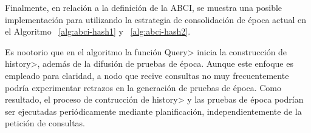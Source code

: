 
Finalmente, en relación a la definición de la ABCI, se muestra una posible implementación para
\hashchain utilizando la estrategia de consolidación de época actual en el Algoritmo ~\ref{alg:abci-hash1}
y ~\ref{alg:abci-hash2}.

Es nootorio que en el algoritmo la función \<Query> inicia la construcción de \<history>, además de
la difusión de pruebas de época. Aunque este enfoque es empleado para claridad, a nodo que recive consultas
no muy frecuentemente podría experimentar retrazos en la generación de pruebas de época.
Como resultado, el proceso de contrucción de \<history> y las pruebas de época podrían ser ejecutadas
periódicamente mediante planificación, independientemente de la petición de consultas.



%

